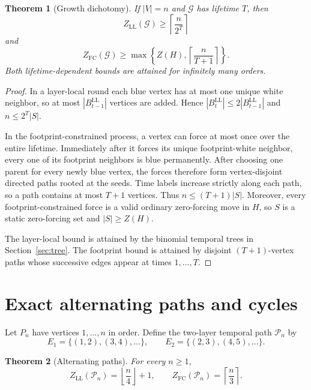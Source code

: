 \documentclass[11pt]{article}
\newtheorem{theorem}{Theorem}[section]
\theoremstyle{definition}
\theoremstyle{remark}
\newcommand{\calG}{\mathcal{G}}
\newcommand{\calP}{\mathcal{P}}
\newcommand{\LL}{\mathrm{LL}}
\newcommand{\FC}{\mathrm{FC}}
\begin{document}
\begin{theorem}[Growth dichotomy]\label{thm:growth}
If $|V|=n$ and $\calG$ has lifetime $T$, then
\[
 Z_{\LL}(\calG)\ge \left\lceil\frac{n}{2^T}\right\rceil
\]
and
\[
 Z_{\FC}(\calG)\ge
 \max\left\{Z(H),\left\lceil\frac{n}{T+1}\right\rceil\right\}.
\]
Both lifetime-dependent bounds are attained for infinitely many orders.
\end{theorem}

\begin{proof}
In a layer-local round each blue vertex has at most one unique white
neighbor, so at most $|B_{t-1}^{\LL}|$ vertices are added.  Hence
$|B_t^{\LL}|\le 2|B_{t-1}^{\LL}|$ and
$n\le 2^T|S|$.

In the footprint-constrained process, a vertex can force at most once over
the entire lifetime.  Immediately after it forces its unique footprint-white
neighbor, every one of its footprint neighbors is blue permanently.  After
choosing one parent for every newly blue vertex, the forces therefore form
vertex-disjoint directed paths rooted at the seeds.  Time labels increase
strictly along each path, so a path contains at most $T+1$ vertices.  Thus
$n\le (T+1)|S|$.  Moreover, every footprint-constrained force is a valid
ordinary zero-forcing move in $H$, so $S$ is a static zero-forcing set and
$|S|\ge Z(H)$.

The layer-local bound is attained by the binomial temporal trees in
Section~\ref{sec:tree}.  The footprint bound is attained by disjoint
$(T+1)$-vertex paths whose successive edges appear at times $1,\ldots,T$.
\end{proof}

\section{Exact alternating paths and cycles}\label{sec:exact}

Let $P_n$ have vertices $1,\ldots,n$ in order.  Define the two-layer temporal
path $\calP_n$ by
\[
 E_1=\{(1,2),(3,4),\ldots\},
 \qquad
 E_2=\{(2,3),(4,5),\ldots\}.
\]

\begin{theorem}[Alternating paths]\label{thm:path}
For every $n\ge1$,
\[
 Z_{\LL}(\calP_n)=\left\lfloor\frac n4\right\rfloor+1,
 \qquad
 Z_{\FC}(\calP_n)=\left\lceil\frac n3\right\rceil.
\]
\end{theorem}
\end{document}
